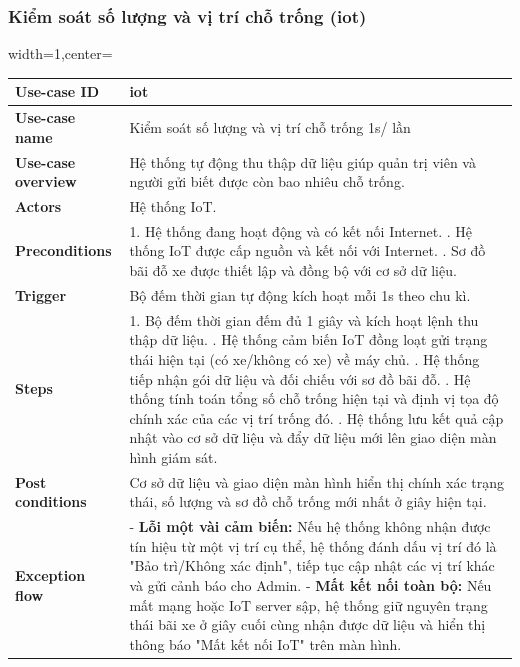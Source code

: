 \subsubsection{Kiểm soát số lượng và vị trí chỗ trống (iot)}
\begin{adjustbox}{width=1\textwidth,center=\textwidth}
\small
\begin{tabular}{|>{\centering\arraybackslash}m{3.5cm}|m{13.2cm}|}
\hline
\textbf{Use-case ID} & iot \\ \hline
\textbf{Use-case name} & Kiểm soát số lượng và vị trí chỗ trống 1s/ lần \\ \hline
\textbf{Use-case overview} & Hệ thống tự động thu thập dữ liệu giúp quản trị viên và người gửi biết được còn bao nhiêu chỗ trống. \\ \hline
\textbf{Actors} & Hệ thống IoT. \\ \hline
\textbf{Preconditions} & 
1. Hệ thống đang hoạt động và có kết nối Internet. \newline
2. Hệ thống IoT được cấp nguồn và kết nối với Internet. \newline
3. Sơ đồ bãi đỗ xe được thiết lập và đồng bộ với cơ sở dữ liệu. \\ \hline
\textbf{Trigger} & Bộ đếm thời gian tự động kích hoạt mỗi 1s theo chu kì. \\ \hline
\textbf{Steps} & 
1. Bộ đếm thời gian đếm đủ 1 giây và kích hoạt lệnh thu thập dữ liệu. \newline
2. Hệ thống cảm biến IoT đồng loạt gửi trạng thái hiện tại (có xe/không có xe) về máy chủ. \newline
3. Hệ thống tiếp nhận gói dữ liệu và đối chiếu với sơ đồ bãi đỗ. \newline
4. Hệ thống tính toán tổng số chỗ trống hiện tại và định vị tọa độ chính xác của các vị trí trống đó. \newline
5. Hệ thống lưu kết quả cập nhật vào cơ sở dữ liệu và đẩy dữ liệu mới lên giao diện màn hình giám sát. \\ \hline
\textbf{Post conditions} & Cơ sở dữ liệu và giao diện màn hình hiển thị chính xác trạng thái, số lượng và sơ đồ chỗ trống mới nhất ở giây hiện tại.\\ \hline
\textbf{Exception flow} & - \textbf{Lỗi một vài cảm biến:} Nếu hệ thống không nhận được tín hiệu từ một vị trí cụ thể, hệ thống đánh dấu vị trí đó là "Bảo trì/Không xác định", tiếp tục cập nhật các vị trí khác và gửi cảnh báo cho Admin.\newline
- \textbf{Mất kết nối toàn bộ:} Nếu mất mạng hoặc IoT server sập, hệ thống giữ nguyên trạng thái bãi xe ở giây cuối cùng nhận được dữ liệu và hiển thị thông báo "Mất kết nối IoT" trên màn hình. \\ \hline
\end{tabular}
\end{adjustbox}